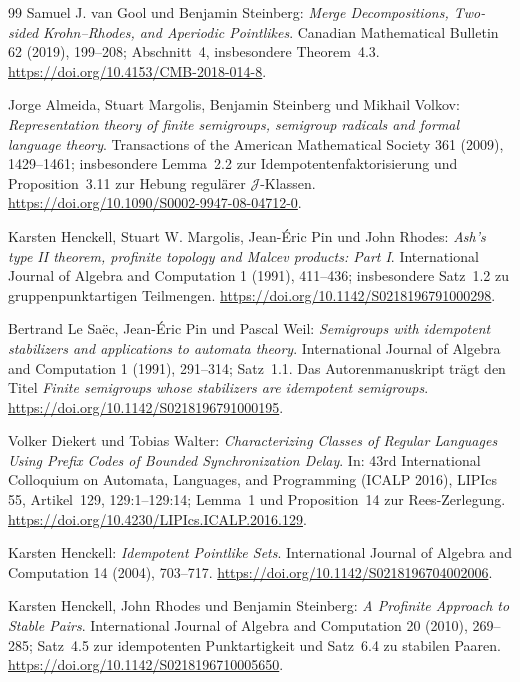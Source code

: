 \begin{thebibliography}{99}
Samuel J. van Gool und Benjamin Steinberg:
\emph{Merge Decompositions, Two-sided Krohn--Rhodes, and Aperiodic Pointlikes}.
Canadian Mathematical Bulletin 62 (2019), 199--208;
Abschnitt~4, insbesondere Theorem~4.3.
\url{https://doi.org/10.4153/CMB-2018-014-8}.

Jorge Almeida, Stuart Margolis, Benjamin Steinberg und Mikhail Volkov:
\emph{Representation theory of finite semigroups, semigroup radicals
and formal language theory}.
Transactions of the American Mathematical Society 361 (2009), 1429--1461;
insbesondere Lemma~2.2 zur Idempotentenfaktorisierung und
Proposition~3.11 zur Hebung regulärer $\mathcal J$-Klassen.
\url{https://doi.org/10.1090/S0002-9947-08-04712-0}.

Karsten Henckell, Stuart W. Margolis, Jean-Éric Pin und John Rhodes:
\emph{Ash's type II theorem, profinite topology and Malcev products: Part I}.
International Journal of Algebra and Computation 1 (1991), 411--436;
insbesondere Satz~1.2 zu gruppenpunktartigen Teilmengen.
\url{https://doi.org/10.1142/S0218196791000298}.

Bertrand Le Saëc, Jean-Éric Pin und Pascal Weil:
\emph{Semigroups with idempotent stabilizers and applications to automata theory}.
International Journal of Algebra and Computation 1 (1991), 291--314;
Satz~1.1. Das Autorenmanuskript trägt den Titel
\emph{Finite semigroups whose stabilizers are idempotent semigroups}.
\url{https://doi.org/10.1142/S0218196791000195}.

Volker Diekert und Tobias Walter:
\emph{Characterizing Classes of Regular Languages Using Prefix Codes of
Bounded Synchronization Delay}.
In: 43rd International Colloquium on Automata, Languages, and Programming
(ICALP 2016), LIPIcs 55, Artikel~129, 129:1--129:14;
Lemma~1 und Proposition~14 zur Rees-Zerlegung.
\url{https://doi.org/10.4230/LIPIcs.ICALP.2016.129}.

Karsten Henckell: \emph{Idempotent Pointlike Sets}.
International Journal of Algebra and Computation 14 (2004), 703--717.
\url{https://doi.org/10.1142/S0218196704002006}.

Karsten Henckell, John Rhodes und Benjamin Steinberg:
\emph{A Profinite Approach to Stable Pairs}.
International Journal of Algebra and Computation 20 (2010), 269--285;
Satz~4.5 zur idempotenten Punktartigkeit und Satz~6.4 zu stabilen Paaren.
\url{https://doi.org/10.1142/S0218196710005650}.


\end{thebibliography}
